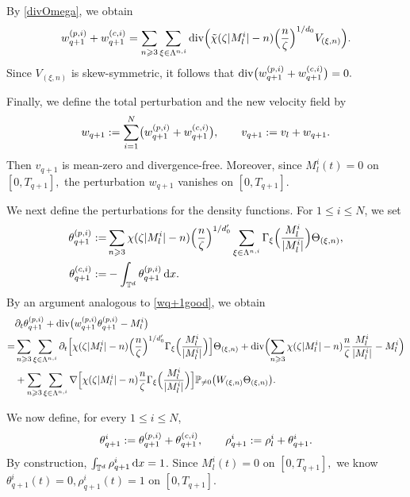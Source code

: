 \documentclass[UTF-8,reqno]{amsart}
\numberwithin{equation}{section}
\theoremstyle{definition}
\def\dif{{\mathord{{\rm d}}}}
\def\geq{\geqslant}
\def\leq{\leqslant}
\def\div{\mathord{{\rm div}}}
\def\dif{{\mathord{{\rm d}}}}
\def\geq{\geqslant}
\def\leq{\leqslant}
\def\div{\mathord{{\rm div}}}
\begin{document}
By \eqref{divOmega}, we obtain
\begin{align}
w_{q+1}^{(p,i)}
+
w_{q+1}^{(c,i)}
=
\sum_{n\geq3}
\sum_{\xi\in\Lambda^{n,i}}
\div\Bigl(
\tilde{\chi}(\zeta|M_l^i|-n)
\Bigl(\frac{n}{\zeta}\Bigr)^{1/d_0}
V_{(\xi,n)}
\Bigr).
\label{eq:6wq+1p+wq+1c}
\end{align}
Since $V_{(\xi,n)}$ is skew-symmetric, it follows that
$
\div\bigl(
w_{q+1}^{(p,i)}
+
w_{q+1}^{(c,i)}
\bigr)=0.
$

Finally, we define the total perturbation and the new velocity field by
\begin{align}
w_{q+1}
:=
\sum_{i=1}^{N}
\bigl(
w_{q+1}^{(p,i)}
+
w_{q+1}^{(c,i)}
\bigr),
\qquad
v_{q+1}
:=
v_l+w_{q+1}.
\notag
\end{align}
Then $v_{q+1}$ is mean-zero and divergence-free.
Moreover, since $M_l^i(t)=0$ on $[0,T_{q+1}],$ the perturbation $w_{q+1}$  vanishes  on $[0,T_{q+1}]$. 
 
We next define the perturbations for the density functions. 
For $1\leq i\leq N$, we set
\begin{align}
\theta_{q+1}^{(p,i)}
:=
&\sum_{n\geq3}
\chi(\zeta|M_l^i|-n)
\Bigl(\frac{n}{\zeta}\Bigr)^{1/d_0'}
\sum_{\xi\in\Lambda^{n,i}}
\Gamma_\xi\Bigl(\frac{M_l^i}{|M_l^i|}\Bigr)
\Theta_{(\xi,n)}
,
\notag\\
\theta_{q+1}^{(c,i)}
:=
&-
\int_{\mathbb{T}^d}
\theta_{q+1}^{(p,i)}\,\dif x.
\notag
\end{align}
By an argument analogous to \eqref{wq+1good}, we obtain
\begin{align}
&
\partial_t\theta_{q+1}^{(p,i)}
+
\div\bigl(
w_{q+1}^{(p,i)}
\theta_{q+1}^{(p,i)}
-
M_l^i
\bigr)
\notag\\
=
&
\sum_{n\geq3}
\sum_{\xi\in\Lambda^{n,i}}
\partial_t
\Bigl[
\chi(\zeta|M_l^i|-n)
\Bigl(\frac{n}{\zeta}\Bigr)^{1/d_0'}
\Gamma_\xi\Bigl(\frac{M_l^i}{|M_l^i|}\Bigr)
\Bigr]
\Theta_{(\xi,n)}+
\div
\Bigl(
\sum_{n\geq3}
\chi(\zeta|M_l^i|-n)
\frac{n}{\zeta}
\frac{M_l^i}{|M_l^i|}
-
M_l^i
\Bigr)
\notag\\
&+
\sum_{n\geq3}
\sum_{\xi\in\Lambda^{n,i}}
\nabla
\Bigl[
\chi(\zeta|M_l^i|-n)
\frac{n}{\zeta}
\Gamma_\xi\Bigl(\frac{M_l^i}{|M_l^i|}\Bigr)
\Bigr]
\mathbb{P}_{\neq0}
\bigl(
W_{(\xi,n)}
\Theta_{(\xi,n)}
\bigr).
\label{6wq+1good}
\end{align}

We now define, for every $1\leq i\leq N$,
\begin{align}
\theta_{q+1}^i
:=
\theta_{q+1}^{(p,i)}
+
\theta_{q+1}^{(c,i)}
,
\qquad
\rho_{q+1}^i
:=
\rho_l^i+\theta_{q+1}^i.
\notag
\end{align}
By construction,
$
\int_{\mathbb{T}^d}\rho_{q+1}^i\,\dif x=1
$.
Since
$
M_l^i(t)=0
$
on
$
[0,T_{q+1}],
$
we know $\theta_{q+1}^i(t)=0,\rho_{q+1}^i(t)=1
$
on
$
[0,T_{q+1}]
$.  
 
\end{document}
